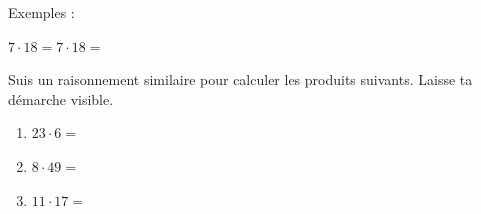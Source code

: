 \documentclass[syllabus_1.tex]{subfiles}
\begin{document}
Exemples : 

\(7 \cdot 18 =\)\hfil\( 7 \cdot 18 =\)
\vspace*{4cm}

\begin{exercise}
    Suis un raisonnement similaire pour calculer les produits suivants. Laisse ta démarche visible.
    \begin{enumerate}[cols=3]
        \item $23 \cdot 6=$
        \item $8 \cdot 49=$
        \item $11 \cdot 17=$
    \end{enumerate}
    \vspace*{4cm}
\end{exercise}


\newpage

\end{document}
